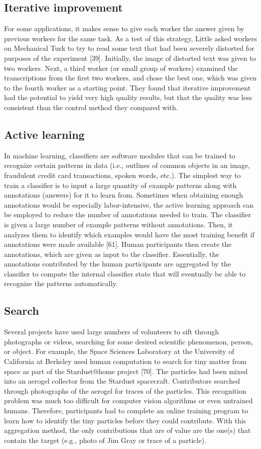 \documentclass{sig-alternate}
\begin{document}
\subsection*{Iterative improvement}
For some applications, it makes sense to give each worker the answer given by previous workers for the same task. As a test of this strategy, Little asked workers on Mechanical Turk to try to read some text that had been severely distorted for purposes of the experiment [39]. Initially, the image of distorted text was given to two workers. Next, a third worker (or small group of workers) examined the transcriptions from the first two workers, and chose the best one, which was given to the fourth worker as a starting point. They found that iterative improvement had the potential to yield very high quality results, but that the quality was less consistent than the control method they compared with.
\subsection*{Active learning}
In machine learning, classifiers are software modules that can be trained to recognize certain patterns in data (i.e., outlines of common objects in an image, fraudulent credit card transactions, spoken words, etc.). The simplest way to train a classifier is to input a large quantity of example patterns along with annotations (answers) for it to learn from. Sometimes when obtaining enough annotations would be especially labor-intensive, the active learning approach can be employed to reduce the number of annotations needed to train. The classifier is given a large number of example patterns without annotations. Then, it analyzes them to identify which examples would have the most training benefit if annotations were made available [61]. Human participants then create the annotations, which are given as input to the classifier.
Essentially, the annotations contributed by the human participants are aggregated by the classifier to compute the internal classifier state that will eventually be able to recognize the patterns automatically.
\subsection*{Search}
Several projects have used large numbers of volunteers to sift through photographs or videos, searching for some desired scientific phenomenon, person, or object.
For example, the Space Sciences Laboratory at the University of California at Berkeley used human computation to search for tiny matter from space as part of the Stardust@home project [70]. The particles had been mixed into an aerogel collector from the Stardust spacecraft. Contributors searched through photographs of the aerogel for traces of the particles. This recognition problem was much too difficult for computer vision algorithms or even untrained humans. Therefore, participants had to complete an online training program to learn how to identify the tiny particles before they could contribute. With this aggregation method, the only contributions that are of value are the one(s) that contain the target (e.g., photo of Jim Gray or trace of a particle).
\end{document}
